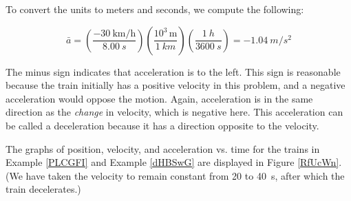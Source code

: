 \documentclass[../../main-ap-physics.tex]{subfiles}
\begin{document}
To convert the units to meters and seconds, we compute the following:

\begin{equation*}
    \bar{a} = \left(\frac{-\SI[per-mode=fraction]{30}{\kilo\meter\per\hour}}{\SI{8.00}{s}}\right)
        \left(\frac{10^3\,\text{m}}{\SI{1}{km}}\right)\left(\frac{\SI{1}{h}}{\SI{3600}{s}}\right) = -\SI{1.04}{m/s^2}
\end{equation*}

The minus sign indicates that acceleration is to the left. This sign is reasonable because the train initially has a positive velocity in this problem, and a negative acceleration would oppose the motion. Again, acceleration is in the same direction as the \textit{change} in velocity, which is negative here. This acceleration can be called a deceleration because it has a direction opposite to the velocity.

\endsolution   

The graphs of position, velocity, and acceleration vs. time for the trains in Example \ref{PLCGFI} and Example \ref{dHBSwG} are displayed in Figure \ref{RfUcWn}. (We have taken the velocity to remain constant from 20 to \SI{40}{s}, after which the train decelerates.)
\end{document}
